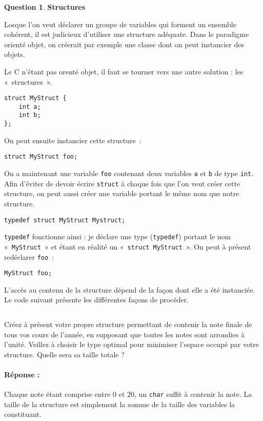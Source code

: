 \documentclass[11pt,a4paper,dvipsnames]{article}
\theoremstyle{definition}%
\newtheorem{Q}{Question}[] %
\newcommand{\reponse}[1]{%
	\ifthenelse {\boolean{corrige}} {\paragraph{Réponse :}
    \color{darkblue} #1 \color{black}} {}
 }
\begin{document}
\begin{Q} \textbf{Structures}

Losque l'on veut déclarer un groupe de variables qui forment un ensemble cohérent, il est judicieux d'utiliser une structure adéquate.
Dans le paradigme orienté objet, on créerait par exemple une classe dont on peut instancier des objets.

Le C n'étant pas orenté objet, il faut se tourner vers une autre solution : les «~structures~».

\begin{verbatim}
struct MyStruct {
	int a;
	int b;
};
\end{verbatim}

On peut ensuite instancier cette structure~:

\begin{verbatim}
struct MyStruct foo;
\end{verbatim}

On a maintenant une variable \texttt{foo} contenant deux variables \texttt{a} et \texttt{b} de type \texttt{int}.
Afin d'éviter de devoir écrire \texttt{struct} à chaque fois que l'on veut créer cette structure, on peut aussi créer une variable portant le même nom que notre structure.

\begin{verbatim}
typedef struct MyStruct Mystruct;
\end{verbatim}

\texttt{typedef} fonctionne ainsi : je déclare une type (\texttt{typedef}) portant le nom «~\texttt{MyStruct}~» et étant en réalité un «~\texttt{struct MyStruct}~».
On peut à présent redéclarer \texttt{foo}~:

\begin{verbatim}
MyStruct foo;
\end{verbatim}

L'accès au contenu de la structure dépend de la façon dont elle a été instanciée.
Le code suivant présente les différentes façons de procéder.

\inputminted{c}{struct.c}

Créez à présent votre propre structure permettant de contenir la note finale de tous vos cours de l'année, en supposant que toutes les notes sont arrondies à l'unité.
Veillez à choisir le type optimal pour minimiser l'espace occupé par votre structure.
Quelle sera sa taille totale ?

\reponse{
Chaque note étant comprise entre 0 et 20, un \texttt{char} suffit à contenir la note.
La taille de la structure  est simplement la somme de la taille des variables la constituant.
}

\end{Q}
\end{document}
